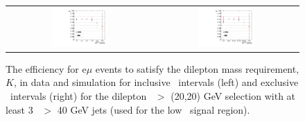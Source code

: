 \begin{figure}[!ht]
\begin{center}
\begin{tabular}{cc}
\includegraphics[width=0.4\textwidth]{plots/extractK_inclusive_lowmet.pdf} &
\includegraphics[width=0.4\textwidth]{plots/extractK_exclusive_lowmet.pdf} \\
\end{tabular}
\caption{\label{fig:K_incl_lowmet}
The efficiency for e$\mu$ events to satisfy the dilepton mass requirement, $K$, in data and simulation for inclusive \MET\ intervals 
(left) and exclusive \MET\ intervals (right) for the dilepton \pt\ $>$ (20,20) GeV selection with at least 3 \pt\ $>$ 40 GeV jets
(used for the low \MET\ signal region). 
}
\end{center}
\end{figure}

